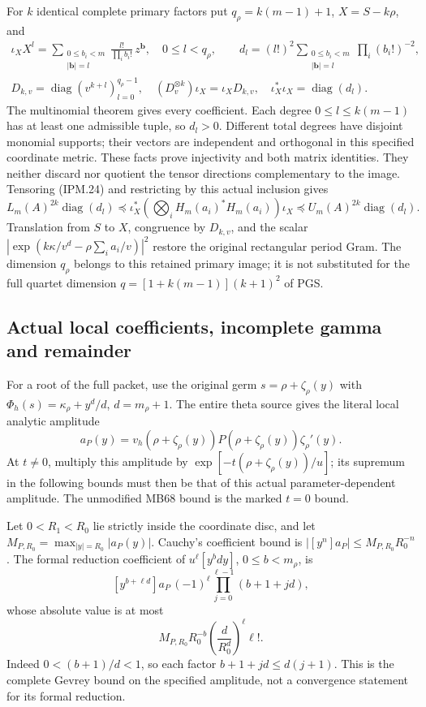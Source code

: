 \documentclass[11pt,a4paper]{article}
\theoremstyle{definition}
\begin{document}
For \(k\) identical complete primary factors put
\(q_\rho=k(m-1)+1\), \(X=S-k\rho\), and
\[
 \begin{gathered}
 \iota_X X^l=
  \sum_{\substack{0\le b_i<m\\|\mathbf b|=l}}
            \frac{l!}{\prod_i b_i!}\,z^{\mathbf b},
       \quad0\le l<q_\rho,\qquad
 d_l=(l!)^2\sum_{\substack{0\le b_i<m\\|\mathbf b|=l}}
                           \prod_i(b_i!)^{-2},\\
 D_{k,v}=\operatorname{diag}(v^{k+l})_{l=0}^{q_\rho-1},\quad
 (D_v^{\otimes k})\iota_X=\iota_XD_{k,v},\quad
 \iota_X^*\iota_X=\operatorname{diag}(d_l).
 \end{gathered}
 \tag{IPM.25}
\]
The multinomial theorem gives every coefficient. Each degree
\(0\le l\le k(m-1)\) has at least one admissible tuple, so \(d_l>0\).
Different total degrees have disjoint monomial supports; their vectors
are independent and orthogonal in this specified coordinate metric.
These facts prove injectivity and both matrix identities. They neither
discard nor quotient the tensor directions complementary to the image.
Tensoring (IPM.24) and restricting by this actual inclusion gives
\[
 L_m(A)^{2k}\operatorname{diag}(d_l)
 \preceq\iota_X^*\left(\bigotimes_iH_m(a_i)^*H_m(a_i)\right)\iota_X
 \preceq U_m(A)^{2k}\operatorname{diag}(d_l).
 \tag{IPM.26}
\]
Translation from \(S\) to \(X\), congruence by \(D_{k,v}\), and
the scalar \(|\exp(k\kappa/v^d-\rho\sum_i a_i/v)|^2\) restore the
original rectangular period Gram. The dimension \(q_\rho\) belongs
to this retained primary image; it is not substituted for the full
quartet dimension \(q=[1+k(m-1)](k+1)^2\) of PGS.

\subsection{Actual local coefficients, incomplete gamma and remainder}

For a root of the full packet, use the original germ
\(s=\rho+\zeta_\rho(y)\) with
\(\Phi_h(s)=\kappa_\rho+y^d/d\), \(d=m_\rho+1\).
The entire theta source gives the literal local analytic amplitude
\[
 a_P(y)=v_h(\rho+\zeta_\rho(y))
        P(\rho+\zeta_\rho(y))\zeta_\rho'(y).
 \tag{IPM.27}
\]
At \(t\ne0\), multiply this amplitude by
\(\exp[-t(\rho+\zeta_\rho(y))/u]\); its supremum in the following
bounds must then be that of this actual parameter-dependent amplitude.
The unmodified MB68 bound is the marked \(t=0\) bound.

Let \(0<R_1<R_0\) lie strictly inside the coordinate disc, and let
\(M_{P,R_0}=\max_{|y|=R_0}|a_P(y)|\). Cauchy's coefficient bound is
\(|[y^n]a_P|\le M_{P,R_0}R_0^{-n}\). The formal reduction coefficient
of \(u^\ell[y^bdy]\), \(0\le b<m_\rho\), is
\[
 [y^{b+\ell d}]a_P\,(-1)^\ell
                      \prod_{j=0}^{\ell-1}(b+1+jd),
\]
whose absolute value is at most
\[
 M_{P,R_0}R_0^{-b}
       \left(\frac d{R_0^d}\right)^\ell\ell!.
 \tag{IPM.28}
\]
Indeed \(0<(b+1)/d<1\), so each factor \(b+1+jd\le d(j+1)\).
This is the complete Gevrey bound on the specified amplitude, not a
convergence statement for its formal reduction.
\end{document}
